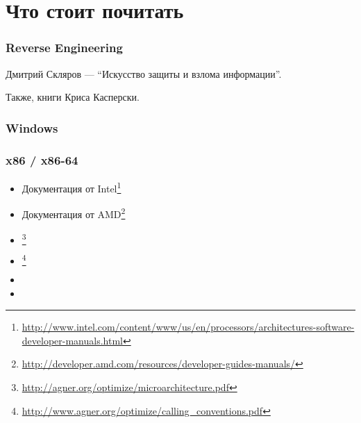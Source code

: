 \chapter{Что стоит почитать}


\subsection{Reverse Engineering}



Дмитрий Скляров --- ``Искусство защиты и взлома информации''.

Также, книги Криса Касперски.

\subsection{Windows}



\subsection{\CCpp}



\subsection{x86 / x86-64}

\label{x86_manuals}
\begin{itemize}
\item Документация от Intel\footnote{\AlsoAvailableAs \url{http://www.intel.com/content/www/us/en/processors/architectures-software-developer-manuals.html}}

\item Документация от AMD\footnote{\AlsoAvailableAs \url{http://developer.amd.com/resources/developer-guides-manuals/}}

\item \AgnerFog{}\footnote{\AlsoAvailableAs \url{http://agner.org/optimize/microarchitecture.pdf}}

\item \AgnerFogCC{}\footnote{\AlsoAvailableAs \url{http://www.agner.org/optimize/calling_conventions.pdf}}

\item \IntelOptimization

\item \AMDOptimization
\end{itemize}

